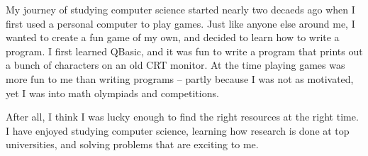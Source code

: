 
My journey of studying computer science started nearly two decaeds ago when I first used a personal computer to play games. Just like anyone else around me, I wanted to create a fun game of my own, and decided to learn how to write a program. I first learned QBasic, and it was fun to write a program that prints out a bunch of characters on an old CRT monitor. At the time playing games was more fun to me than writing programs -- partly because I was not as motivated, yet I was into math olympiads and competitions.




After all, I think I was lucky enough to find the right resources at the right time.  I have enjoyed studying computer science, learning how research is done at top universities, and solving problems that are exciting to me.


